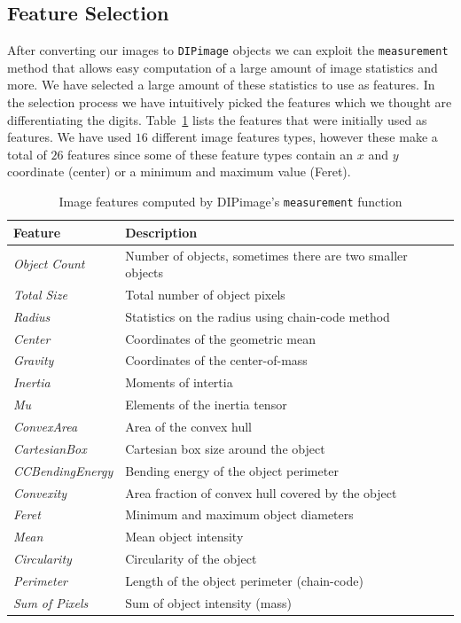 \documentclass{article}
\begin{document}
\subsection{Feature Selection}

After converting our images to \texttt{DIPimage} objects we can exploit the \texttt{measurement} method that allows easy computation of a large amount of image statistics and more. We have selected a large amount of these statistics to use as features. In the selection process we have intuitively picked the features which we thought are differentiating the digits. Table~\ref{table:image-features} lists the features that were initially used as features. We have used $16$ different image features types, however these make a total of $26$ features since some of these feature types contain an $x$ and $y$ coordinate (center) or a minimum and maximum value (Feret).

\begin{table}[H]
    \small
	\centering
    \begin{tabular}{|l|l|}
    \hline
    \textbf{Feature} & \textbf{Description} \\
    \hline
    \emph{Object Count}     & Number of objects, sometimes there are two smaller objects \\
    \emph{Total Size}       & Total number of object pixels           \\
    \emph{Radius}       	& Statistics on the radius using chain-code method           \\
    \emph{Center}  		& Coordinates of the geometric mean \\
    \emph{Gravity} 		& Coordinates of the center-of-mass \\
    \emph{Inertia} 		& Moments of intertia \\
    \emph{Mu} 				& Elements of the inertia tensor \\
    \emph{ConvexArea} 		& Area of the convex hull \\
    \emph{CartesianBox} 	& Cartesian box size around the object \\
    \emph{CCBendingEnergy} & Bending energy of the object perimeter \\
    \emph{Convexity} 		& Area fraction of convex hull covered by the object \\
    \emph{Feret} 			& Minimum and maximum object diameters \\
    \emph{Mean} 			& Mean object intensity \\
    \emph{Circularity} 	& Circularity of the object \\
    \emph{Perimeter} 		& Length of the object perimeter (chain-code) \\
    \emph{Sum of Pixels} 	& Sum of object intensity (mass) \\
    \hline
    \end{tabular}
    \caption{Image features computed by DIPimage's \texttt{measurement} function \label{table:image-features}}
\end{table}
\end{document}
